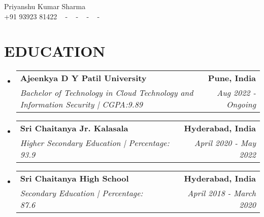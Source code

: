 \documentclass[letterpaper,11pt]{article}
\makeatletter
\newcommand{\resumeSubheading}[4]{
  \vspace{-2pt}\item
    \begin{tabular*}{1.0\textwidth}[t]{l@{\extracolsep{\fill}}r}
      \textbf{\large#1} & \textbf{\small #2} \\
      \textit{\large#3} & \textit{\small #4} \\
      
    \end{tabular*}\vspace{-7pt}
}
\newcommand{\resumeSubHeadingListStart}{\begin{itemize}[leftmargin=0.0in, label={}]}
\newcommand{\resumeSubHeadingListEnd}{\end{itemize}}
\makeatother
\begin{document}


\begin{center}
    {\huge Priyanshu Kumar Sharma} \\ \vspace{2pt} 
    {+91 93923 81422} ~ 
    \small{-}
    \href{priyanshu17ks@gmail.com}{\color{blue}{priyanshu17ks@gmail.com}} ~ 
    \small{-}
    \href{https://www.linkedin.com/in/priyanshu-kumar-sharma-333800251/}{ \color{blue}{LinkedIn}}  ~
    \small{-}
    \href{https://github.com/PriyanshuKSharma/}{ \color{blue}{GitHub}} ~
    \small{-}
    \href{https://hub.docker.com/u/priyanshuksharma}{\color{blue}{DockerHub}} ~
    \vspace{-7pt}
\end{center}

\section{\color{airforceblue}EDUCATION}
  \resumeSubHeadingListStart
    \resumeSubheading
      {Ajeenkya D Y Patil University}{Pune, India}
      {Bachelor of Technology in Cloud Technology and Information Security {| CGPA:9.89}}{Aug 2022 - Ongoing}
    \vspace{-4pt}
     \resumeSubheading
      {Sri Chaitanya Jr. Kalasala}{Hyderabad, India}
      {Higher Secondary Education {| Percentage: 93.9}}{April 2020 - May 2022}
    \vspace{-4pt}
     \resumeSubheading
      {Sri Chaitanya High School}{Hyderabad, India}
      {Secondary Education {| Percentage: 87.6}}{April 2018 - March 2020}

    
  \resumeSubHeadingListEnd
  \vspace{-10pt}

\end{document}
